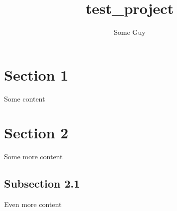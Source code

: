\documentclass{article}
\title{test\_project}
\author{Some Guy}
\date{}
\begin{document}
\maketitle

\section{Section 1}
Some content

\section{Section 2}
Some more content

\subsection{Subsection 2.1}
Even more content
\end{document}
